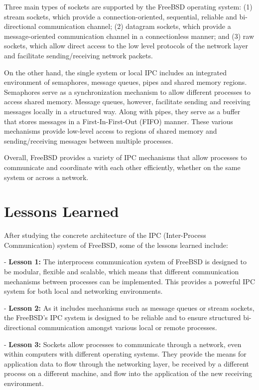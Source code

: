\documentclass[12pt, dvipsnames, a4paper]{article}
\begin{document}
Three main types of sockets are supported by the FreeBSD operating system: (1) stream sockets, which provide a connection-oriented, sequential, reliable and bi-directional communication channel; (2) datagram sockets, which provide a message-oriented communication channel in a connectionless manner; and (3) raw sockets, which allow direct access to the low level protocols of the network layer and facilitate sending/receiving network packets.

On the other hand, the single system or local IPC includes an integrated environment of semaphores, message queues, pipes and shared memory regions. Semaphores serve as a synchronization mechanism to allow different processes to access shared memory. Message queues, however, facilitate sending and receiving messages locally in a structured way. Along with pipes, they serve as a buffer that stores messages in a First-In-First-Out (FIFO) manner. These various mechanisms provide low-level access to regions of shared memory and sending/receiving messages between multiple processes.

Overall, FreeBSD provides a variety of IPC mechanisms that allow processes to communicate and coordinate with each other efficiently, whether on the same system or across a network.

\section{Lessons Learned}
After studying the concrete architecture of the IPC (Inter-Process Communication) system of FreeBSD, some of the lessons learned include:

- \textbf{Lesson 1:} The interprocess communication system of FreeBSD is designed to be modular, flexible and scalable, which means that different communication mechanisms between processes can be implemented. This provides a powerful IPC system  for both local and networking environments.

- \textbf{Lesson 2:} As it includes mechanisms such as message queues or stream sockets, the FreeBSD’s IPC system is designed to be reliable and to ensure structured bi-directional communication amongst various local or remote processes.

- \textbf{Lesson 3:} Sockets allow processes to communicate through a network, even within computers with different operating systems. They provide the means for application data to flow through the networking layer, be received by a different process on a different machine, and flow into the application of the new receiving environment.
\end{document}
